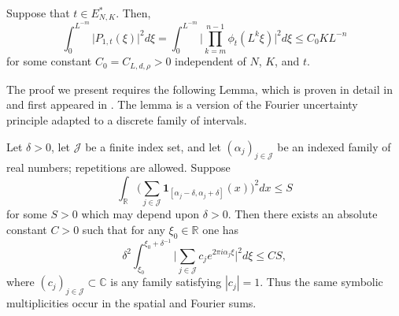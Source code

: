 \documentclass[12pt]{amsart}
\numberwithin{equation}{section}
\begin{document}
\begin{proposition}\label{prop:shortintervalbound}
Suppose that $t \in E_{N,K}^*$. Then,
\begin{equation}\label{eq:shortintervalbound}
    \int_0^{L^{-m}} \lvert P_{1,t} (\xi) \rvert^2 d \xi  = \int_0^{L^{-m}} \bigg\lvert \prod_{k = m}^{n - 1} \phi_t (L^k \xi )\bigg\vert^2 d \xi  \leq C_0 K L^{-n}
\end{equation}
for some constant $C_0=C_{L,d,\rho}>0$ independent of $N$, $K$, and $t$.
\end{proposition}

The proof we present requires the following Lemma, which is proven in detail in \cite[Section 5.4]{BThesis} and first appeared in \cite{BV3}. The lemma is a version of the Fourier uncertainty principle adapted to a discrete family of intervals. 

\medskip

\begin{lemma}\label{lma:poissonlocalization}
Let $\delta>0$, let $\mathcal J$ be a finite index set, and let
$(\alpha_j)_{j\in\mathcal J}$ be an indexed family of real numbers; repetitions
are allowed.  Suppose
$$
\int_{\mathbb{R}} \bigg(\sum\limits_{j\in\mathcal J} \mathbf{1}_{[\alpha_j - \delta, \alpha_j + \delta]} (x) \bigg)^2 dx \leq S
$$
for some $S > 0$ which may depend upon $\delta > 0$. Then there exists an absolute constant $C > 0$ such that for any $\xi_0 \in \mathbb{R}$ one has
$$
\delta^2 \int_{\xi_0}^{\xi_0 + \delta^{-1}} \bigg\lvert \sum\limits_{j\in\mathcal J} c_j e^{2\pi i \alpha_j \xi} \bigg\rvert^2 d \xi \leq C S,
$$
where $(c_j)_{j\in\mathcal J}\subset\mathbb C$ is any family satisfying
$|c_j|=1$.  Thus the same symbolic multiplicities occur in the spatial and
Fourier sums.
\end{lemma}
\end{document}
